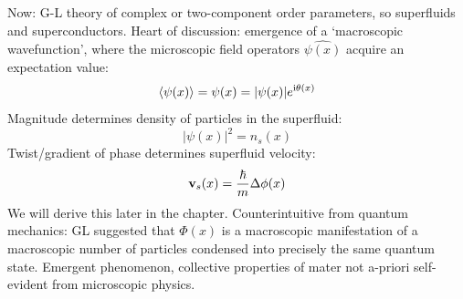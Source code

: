 \documentclass[../main.tex]{subfiles}
\begin{document}
Now: G-L theory of complex or two-component order parameters, so superfluids and superconductors.
Heart of discussion: emergence of a `macroscopic wavefunction', where the microscopic field operators \(\hat{\psi(x)}\) acquire an expectation value:
\begin{equation}
    \braket{\psi (x)} = \psi (x) = \vert \psi (x) \vert e^{\mathrm{i} \theta(x)}
\end{equation}
Magnitude determines density of particles in the superfluid:
\begin{equation}
    \vert \psi(x) \vert^2 = n_s (x)
\end{equation}
Twist/gradient of phase determines superfluid velocity:
\begin{equation}
    \bm{\mathrm{v}}_s (x) = \frac{\hbar}{m} \Delta \phi (x)
\end{equation}
We will derive this later in the chapter.
Counterintuitive from quantum mechanics: GL suggested that \(\Phi(x)\) is a macroscopic manifestation of a macroscopic number of particles condensed into precisely the same quantum state.
Emergent phenomenon, collective properties of mater not a-priori self-evident from microscopic physics.
\end{document}
